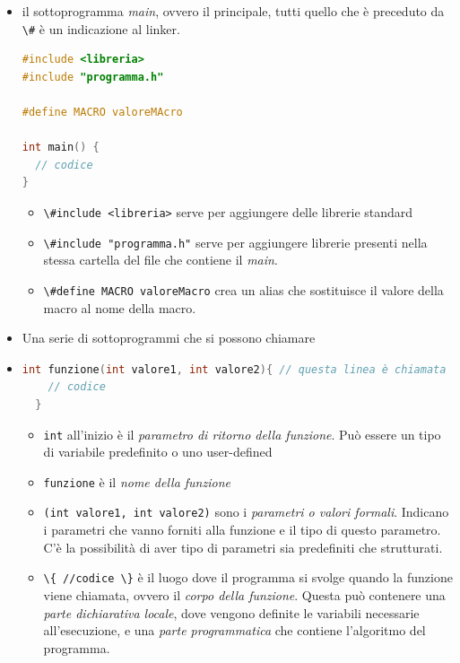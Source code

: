 \documentclass[
  paper=a4,
  oneside  ,captions=tableheading
]{scrbook}
\newcommand{\passthrough}[1]{#1}
\providecommand{\tightlist}{%
  \setlength{\itemsep}{0pt}\setlength{\parskip}{0pt}}
\begin{document}
\begin{itemize}
\item
  il sottoprogramma \emph{main}, ovvero il principale, tutti quello che
  è preceduto da \passthrough{\lstinline!\#!} è un indicazione al
  linker.

\begin{lstlisting}[language=C]
#include <libreria>
#include "programma.h"

#define MACRO valoreMAcro

int main() {
  // codice
}
\end{lstlisting}

  \begin{itemize}
  \tightlist
  \item
    \passthrough{\lstinline!\#include <libreria>!} serve per aggiungere
    delle librerie standard
  \item
    \passthrough{\lstinline!\#include "programma.h"!} serve per
    aggiungere librerie presenti nella stessa cartella del file che
    contiene il \emph{main}.
  \item
    \passthrough{\lstinline!\#define MACRO valoreMacro!} crea un alias
    che sostituisce il valore della macro al nome della macro.
  \end{itemize}
\item
  Una serie di sottoprogrammi che si possono chiamare
\item
\begin{lstlisting}[language=C]
  int funzione(int valore1, int valore2){ // questa linea è chiamata testata
    // codice
  }
\end{lstlisting}

  \begin{itemize}
  \tightlist
  \item
    \passthrough{\lstinline!int!} all'inizio è il \emph{parametro di
    ritorno della funzione}. Può essere un tipo di variabile predefinito
    o uno user-defined
  \item
    \passthrough{\lstinline!funzione!} è il \emph{nome della funzione}
  \item
    \passthrough{\lstinline!(int valore1, int valore2)!} sono i
    \emph{parametri o valori formali}. Indicano i parametri che vanno
    forniti alla funzione e il tipo di questo parametro. C'è la
    possibilità di aver tipo di parametri sia predefiniti che
    strutturati.
  \item
    \passthrough{\lstinline!\{ //codice \}!} è il luogo dove il
    programma si svolge quando la funzione viene chiamata, ovvero il
    \emph{corpo della funzione}. Questa può contenere una \emph{parte
    dichiarativa locale}, dove vengono definite le variabili necessarie
    all'esecuzione, e una \emph{parte programmatica} che contiene
    l'algoritmo del programma.
  \end{itemize}
\end{itemize}
\end{document}
